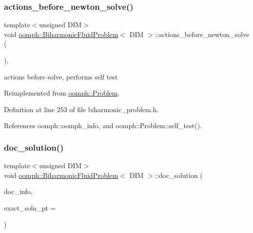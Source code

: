 \subsubsection{\texorpdfstring{actions\+\_\+before\+\_\+newton\+\_\+solve()}{actions\_before\_newton\_solve()}}
{\footnotesize\ttfamily template$<$unsigned D\+IM$>$ \\
void \hyperlink{classoomph_1_1BiharmonicFluidProblem}{oomph\+::\+Biharmonic\+Fluid\+Problem}$<$ D\+IM $>$\+::actions\+\_\+before\+\_\+newton\+\_\+solve (\begin{DoxyParamCaption}{ }\end{DoxyParamCaption})\hspace{0.3cm}{\ttfamily [inline]}, {\ttfamily [virtual]}}



actions before solve, performs self test 



Reimplemented from \hyperlink{classoomph_1_1Problem_a0c8d70891f7369bb4bf8412fa1a08ecb}{oomph\+::\+Problem}.



Definition at line 253 of file biharmonic\+\_\+problem.\+h.



References oomph\+::oomph\+\_\+info, and oomph\+::\+Problem\+::self\+\_\+test().

\mbox{\label{classoomph_1_1BiharmonicFluidProblem_a095e8526d834c05c492929bd5017dfa5}} 
\subsubsection{\texorpdfstring{doc\+\_\+solution()}{doc\_solution()}}
{\footnotesize\ttfamily template$<$unsigned D\+IM$>$ \\
void \hyperlink{classoomph_1_1BiharmonicFluidProblem}{oomph\+::\+Biharmonic\+Fluid\+Problem}$<$ D\+IM $>$\+::doc\+\_\+solution (\begin{DoxyParamCaption}\item[{\hyperlink{classoomph_1_1DocInfo}{Doc\+Info} \&}]{doc\+\_\+info,  }\item[{\hyperlink{classoomph_1_1FiniteElement_a690fd33af26cc3e84f39bba6d5a85202}{Finite\+Element\+::\+Steady\+Exact\+Solution\+Fct\+Pt}}]{exact\+\_\+soln\+\_\+pt = {} }\end{DoxyParamCaption})}



